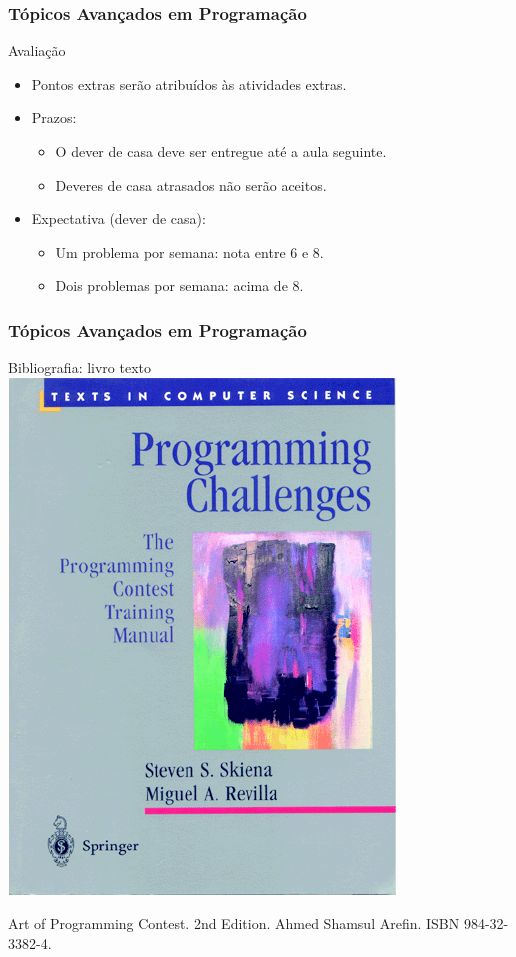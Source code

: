 \begin{frame}
 \frametitle{Tópicos Avançados em Programação}
 \begin{block}{Avaliação}
  \begin{itemize}
   \item Pontos extras serão atribuídos às atividades extras.
   \item Prazos:
    \begin{itemize}
     \item O dever de casa deve ser entregue até a aula seguinte.
     \item Deveres de casa atrasados não serão aceitos.
    \end{itemize}
   \item Expectativa (dever de casa):
    \begin{itemize}
     \item Um problema por semana: nota entre 6 e 8.
     \item Dois problemas por semana: acima de 8.
    \end{itemize}
  \end{itemize}
 \end{block}
\end{frame}
\begin{frame}
 \frametitle{Tópicos Avançados em Programação}
 \begin{block}{Bibliografia: livro texto}
  \centering
  \includegraphics[height=.5\textheight]{figuras/prog-chall-book}
 \end{block}
 \begin{block}{}
  Art of Programming Contest. 2nd Edition. Ahmed Shamsul Arefin. ISBN 984-32-3382-4.
 \end{block}
\end{frame}
